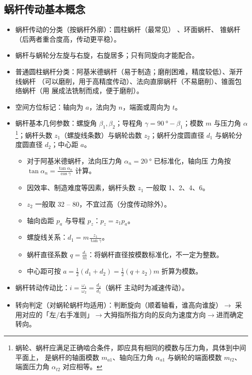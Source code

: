 \documentclass[12pt,a4paper]{article}
\newcommand{\tightlist}{\setlength{\parskip}{0pt}\setlength{\itemsep}{0pt}}
\newcommand{\hint}[1]{\textsf{（#1）}}
\newcommand{\minor}[1]{{\color{gray} #1}}
\newcommand{\then}{$\to$}
\begin{document}
\subsection{蜗杆传动基本概念}
\begin{itemize}\tightlist
    \item 蜗杆传动的分类\hint{按蜗杆外廓}：圆柱蜗杆\hint{最常见}\minor{、环面蜗杆、
    锥蜗杆\hint{后两者重合度高，传动更平稳}}。
    \item 蜗杆与蜗轮分左旋与右旋，右旋居多；只有同旋向才能配合。
    \item 普通圆柱蜗杆分类：阿基米德蜗杆\hint{易于制造；磨削困难，精度较低}、渐开线蜗杆
    \hint{可以磨削，用于高精度传动}、法向直廓蜗杆\hint{不易磨削}、锥面包络蜗杆\hint{用
    展成法铣制而成，便于磨削}。
    \item 空间方位标记：轴向为 $a$，法向为 $n$，端面或周向为 $t$。
    \item 蜗杆基本几何参数：螺旋角 $\beta_1,\beta_2$；导程角 $\gamma=\SI{90}\degree
    -\beta_1$；模数 $m$ 与压力角 $\alpha$
    \footnote{蜗轮、蜗杆应满足正确啮合条件，即应具有相同的模数与压力角，具体到中间平面上，
    是蜗杆的轴面模数 $m_{a1}$、轴向压力角 $\alpha_{a1}$ 与蜗轮的端面模数 $m_{t2}$、
    端面压力角 $\alpha_{t2}$ 对应相等。}；蜗杆头数 $z_1$\hint{螺旋线条数}与蜗轮齿数
    $z_2$；蜗杆分度圆直径 $d_1$ 与蜗轮分度圆直径 $d_2$；中心距 $a$。
    \begin{itemize}\tightlist
        \item 对于阿基米德蜗杆，法向压力角 $\alpha_n=\SI{20}\degree$ 已标准化，轴向压
        力角按 $\tan\alpha_n=\frac{\tan\alpha_n}{\cos\gamma}$ 计算。
        \item 因效率、制造难度等因素，蜗杆头数 $z_1$ 一般取 1、2、4、6。
        \item $z_2$ 一般取 32 -- 80，不宜过高\hint{分度传动除外}。
        \item 轴向齿距 $p_a$ 与导程 $p_z$：$p_z=z_1p_a$。
        \item 螺旋线关系：$d_1=m\frac{z_1}{\tan\gamma}$。
        \item 蜗杆直径系数 $q=\frac{d_1}{m}$：将蜗杆直径按模数标准化，不一定为整数。
        \item 中心距可按 $a=\frac12(d_1+d_2)=\frac12(q+z_2)m$ 折算为模数。
    \end{itemize}
    \item 蜗杆转动传动比：$i=\frac{\omega_1}{\omega_2}=\frac{d_2}{d_1}$\hint{蜗杆
    主动时为减速传动}。
    \item 转向判定\hint{对蜗轮蜗杆均适用}：判断旋向\hint{顺着轴看，谁高向谁旋}\then
    采用对应的「左/右手准则」\then 大拇指所指方向的反向为速度方向\then 进而确定转向。
\end{itemize}
\end{document}
